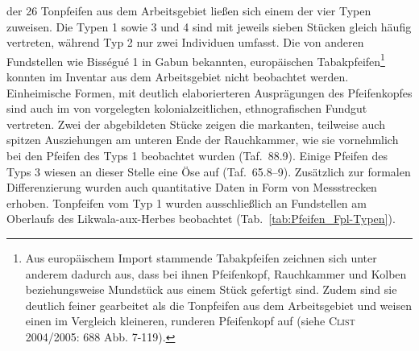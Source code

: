  der 26 Tonpfeifen aus dem Arbeitsgebiet ließen sich einem der vier Typen zuweisen. Die Typen 1 sowie 3 und 4 sind mit jeweils sieben Stücken gleich häufig vertreten, während Typ 2 nur zwei Individuen umfasst. Die von anderen Fundstellen wie Bisségué 1 in Gabun \parencite[688 Abb. 7-119]{Clist.20042005} bekannten, europäischen Tabakpfeifen\footnote{Aus europäischem Import stammende Tabakpfeifen zeichnen sich unter anderem dadurch aus, dass bei ihnen Pfeifenkopf, Rauchkammer und Kolben beziehungsweise Mundstück aus einem Stück gefertigt sind. Zudem sind sie deutlich feiner gearbeitet als die Tonpfeifen aus dem Arbeitsgebiet und weisen einen im Vergleich kleineren, runderen Pfeifenkopf auf (siehe \textsc{Clist} 2004/2005: 688 Abb. 7-119).} konnten im Inventar aus dem Arbeitsgebiet nicht beobachtet werden. Einheimische Formen, mit deutlich elaborierteren Ausprägungen des Pfeifenkopfes sind auch im von \textcite[18]{Coart.1907} vorgelegten kolonialzeitlichen, ethnografischen Fundgut vertreten. Zwei der abgebildeten Stücke zeigen die markanten, teilweise auch spitzen Ausziehungen am unteren Ende der Rauchkammer, wie sie vornehmlich bei den Pfeifen des Typs 1 beobachtet wurden (Taf.~88.9). Einige Pfeifen des Typs 3 wiesen an dieser Stelle eine Öse auf (Taf.~65.8--9). Zusätzlich zur formalen Differenzierung wurden auch quantitative Daten in Form von Messstrecken erhoben. Tonpfeifen vom Typ 1 wurden ausschließlich an Fundstellen am Oberlaufs des Likwala-aux-Herbes beobachtet (Tab.~\ref{tab:Pfeifen_Fpl-Typen}).

